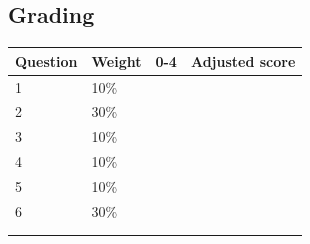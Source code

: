\documentclass[a4paper,12pt]{book}
\begin{document}
    \hrulefill{}
    \subsection*{Grading}
    
    \begin{center}
        
        \begin{tabular}{ | l | l | l | l | }
            \hline
            \textbf{ Question } & \textbf{ Weight } & \textbf{ 0-4 } & \textbf{ Adjusted score }
            \\ \hline{}
            
            1 & 10\% & &    \\ \hline
            2 & 30\% & &    \\ \hline
            3 & 10\% & &    \\ \hline
            4 & 10\% & &    \\ \hline
            5 & 10\% & &    \\ \hline
            6 & 30\% & &    \\ \hline
            & & & \\ \hline
            & & & \\ \hline
            
            
        \end{tabular}
    \end{center}
\end{document}
